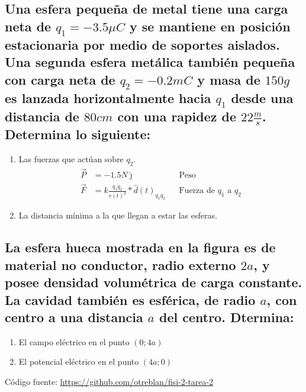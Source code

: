 \documentclass[10pt, twoside]{article}
\begin{document}
\subsection*{Una esfera pequeña de metal tiene una carga neta de $q_1 =-3.5\mu C$
y se mantiene en posición estacionaria por medio de soportes aislados.
Una segunda esfera metálica también pequeña con carga neta de $q_2 =-0.2mC$ y masa de $150g$ es
lanzada horizontalmente hacia $q_1$ desde una distancia de $80cm$ con una rapidez de
$22\frac{m}{s}$. Determina lo siguiente:}%
\begin{enumerate}[label=\textbf{\alph*)}]
	\item Las fuerzas que actúan sobre $q_2$.
		\begin{align*}
			\vec{P} &= -1.5N\hat{\jmath} &&\text{Peso}\\
			\vec{F} &= k \frac{q_1q_2}{r(t)^2}*\hat{d}(t)_{q_1q_2} &&\text{Fuerza de $q_1$ a $q_2$}
		\end{align*}
	\setcounter{enumi}{2}
	\item La distancia mínima a la que llegan a estar las esferas.
\end{enumerate}
\subsection*{La esfera hueca mostrada en la figura es de material no conductor,
radio externo $2a$, y posee densidad volumétrica de carga constante.
La cavidad también es esférica, de radio $a$, con centro a una distancia
$a$ del centro. Dtermina:}%
\begin{enumerate}[label=\textbf{\alph*)}]
	\item El campo eléctrico en el punto $(0;4a)$
	\item El potencial eléctrico en el punto $(4a;0)$
\end{enumerate}
\vfill
Código fuente: \url{https://github.com/otreblan/fisi-2-tarea-2}
\end{document}
